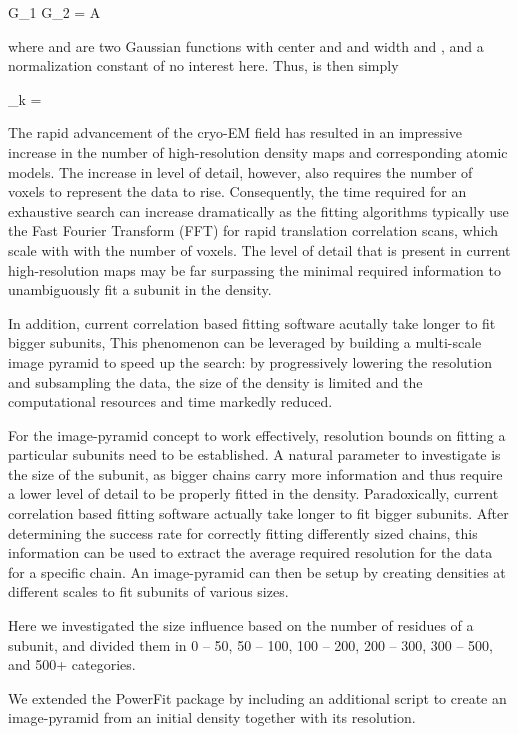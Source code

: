 \startformula
G_1 \ast G_2 = A \exp{}
\stopformula

where  and  are two Gaussian functions with center 
and  and width  and , and  a
normalization constant of no interest here. Thus,  is then simply

\startformula
\sigma_k = 
\stopformula




The rapid advancement of the cryo-EM field has resulted in an impressive
increase in the number of high-resolution density maps and corresponding atomic
models. The increase in level of detail, however, also requires the number of
voxels to represent the data to rise. Consequently, the time required for an
exhaustive search can increase dramatically as the fitting algorithms typically
use the Fast Fourier Transform (FFT) for rapid translation correlation scans,
which scale with  with  the number of voxels. The level of
detail that is present in current high-resolution maps may be far surpassing
the minimal required information to unambiguously fit a subunit in the density.

In addition, current correlation based fitting software acutally take longer to fit bigger subunits, 
This phenomenon can be leveraged by building a multi-scale image pyramid to
speed up the search: by progressively lowering the resolution and subsampling
the data, the size of the density is limited and the computational resources
and time markedly reduced. 

For the image-pyramid concept to work effectively, resolution bounds on fitting
a particular subunits need to be established. A natural parameter to
investigate is the size of the subunit, as bigger chains carry more information
and thus require a lower level of detail to be properly fitted in the density.
Paradoxically, current correlation based fitting software
actually take longer to fit bigger subunits. After determining the success rate for correctly fitting differently
sized chains, this information can be used to extract the average required
resolution for the data for a specific chain. An image-pyramid can then be
setup by creating densities at different scales to fit subunits of various
sizes.

Here we investigated the size influence based on the number of residues of a
subunit, and divided them in 0 -- 50, 50 -- 100, 100 -- 200, 200 -- 300, 300 --
500, and 500+ categories. 



We extended the PowerFit package by including an additional script to create an
image-pyramid from an initial density together with its resolution. 





